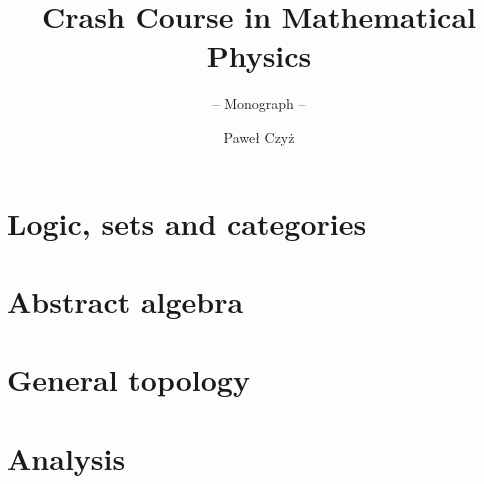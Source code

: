 \documentclass[envcountsame,envcountchap]{svmono}
\begin{document}
\author{Paweł Czyż}
\title{Crash Course in Mathematical Physics\\
{\small}}
\subtitle{-- Monograph --}
\maketitle

\frontmatter %




\tableofcontents

\mainmatter %

\part{Logic, sets and categories}




\part{Abstract algebra}

% 



\part{General topology}



\part{Analysis}




%
%

\backmatter%
% 

\printindex

\end{document}
